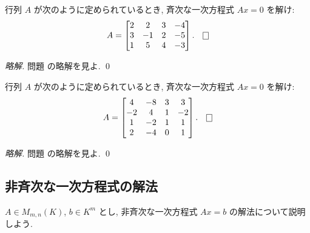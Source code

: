 \documentclass[12pt,twoside]{jarticle}
\newcommand\commentout[1]{#1}
\newcommand\commentout[1]{}
\begin{document}

\begin{question}[5点]
  \label{q:sol-hom-2}
  行列 $A$ が次のように定められているとき, 
  斉次な一次方程式 $Ax=0$ を解け:
  \begin{equation*}
    A = 
    \begin{bmatrix}
      2 &  2 & 3 & -4 \\
      3 & -1 & 2 & -5 \\
      1 &  5 & 4 & -3 \\
    \end{bmatrix}.
    \qed
  \end{equation*}
\end{question}

\commentout{
\begin{proof}[略解]
  問題  の略解を見よ. \qed
\end{proof}
}


\begin{question}[5点]
  \label{q:sol-hom-3}
  行列 $A$ が次のように定められているとき, 
  斉次な一次方程式 $Ax=0$ を解け:
  \begin{equation*}
    A = 
    \begin{bmatrix}
       4 & -8 & 3 &  3 \\
      -2 &  4 & 1 & -2 \\
       1 & -2 & 1 &  1 \\
       2 & -4 & 0 &  1 \\
    \end{bmatrix}.
    \qed
  \end{equation*}
\end{question}

\commentout{
\begin{proof}[略解]
  問題  の略解を見よ. \qed
\end{proof}
}


\subsection{非斉次な一次方程式の解法}
\label{sec:sol-inhom-lin-eq}

$A\in M_{m,n}(K)$, $b\in K^m$ とし, 
非斉次な一次方程式 $Ax=b$ の解法について説明しよう.
\end{document}
